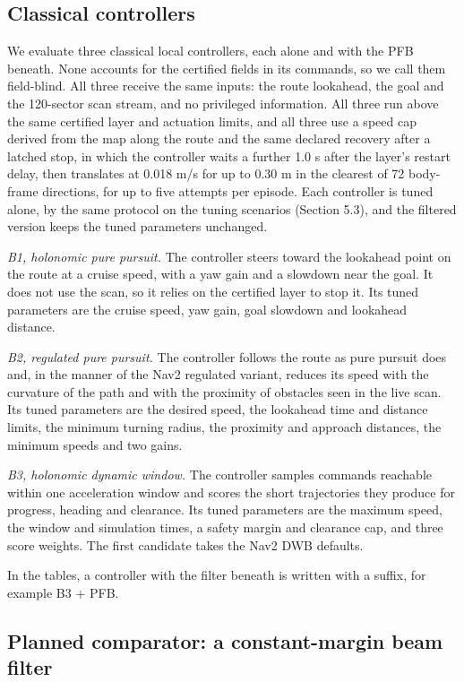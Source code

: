 \subsection{Classical controllers}

We evaluate three classical local controllers, each alone and with the PFB beneath. None accounts for the certified fields in its commands, so we call them field-blind. All three receive the same inputs: the route lookahead, the goal and the 120-sector scan stream, and no privileged information. All three run above the same certified layer and actuation limits, and all three use a speed cap derived from the map along the route and the same declared recovery after a latched stop, in which the controller waits a further 1.0 s after the layer's restart delay, then translates at 0.018 m/s for up to 0.30 m in the clearest of 72 body-frame directions, for up to five attempts per episode. Each controller is tuned alone, by the same protocol on the tuning scenarios (Section 5.3), and the filtered version keeps the tuned parameters unchanged.

\emph{B1, holonomic pure pursuit.} The controller steers toward the lookahead point on the route at a cruise speed, with a yaw gain and a slowdown near the goal. It does not use the scan, so it relies on the certified layer to stop it. Its tuned parameters are the cruise speed, yaw gain, goal slowdown and lookahead distance. \cite{coulter1992purepursuit}

\emph{B2, regulated pure pursuit.} The controller follows the route as pure pursuit does and, in the manner of the Nav2 regulated variant, reduces its speed with the curvature of the path and with the proximity of obstacles seen in the live scan. Its tuned parameters are the desired speed, the lookahead time and distance limits, the minimum turning radius, the proximity and approach distances, the minimum speeds and two gains. \cite{macenski2023rpp}

\emph{B3, holonomic dynamic window.} The controller samples commands reachable within one acceleration window and scores the short trajectories they produce for progress, heading and clearance. Its tuned parameters are the maximum speed, the window and simulation times, a safety margin and clearance cap, and three score weights. The first candidate takes the Nav2 DWB defaults. \cite{fox1997dwa}

In the tables, a controller with the filter beneath is written with a suffix, for example B3 + PFB.

\subsection{Planned comparator: a constant-margin beam filter}


